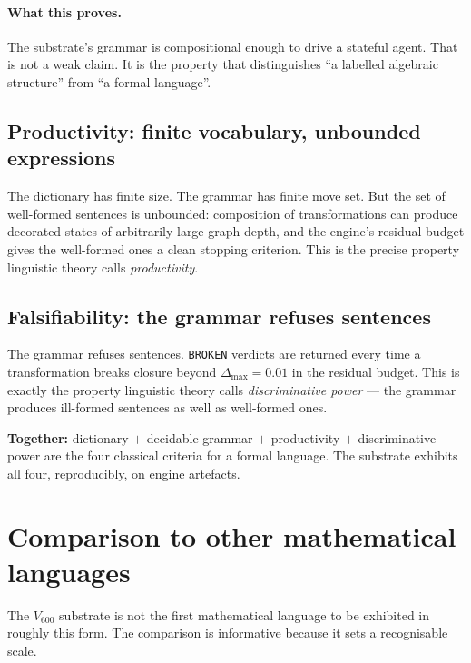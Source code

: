 \documentclass[11pt,a4paper]{article}
\begin{document}
\paragraph{What this proves.} The substrate's grammar is
compositional enough to drive a stateful agent. That is not a
weak claim. It is the property that distinguishes ``a labelled
algebraic structure'' from ``a formal language''.

\subsection{Productivity: finite vocabulary, unbounded
expressions}

The dictionary has finite size. The grammar has finite move set.
But the set of well-formed sentences is unbounded: composition of
transformations can produce decorated states of arbitrarily large
graph depth, and the engine's residual budget gives the well-formed
ones a clean stopping criterion. This is the precise
property linguistic theory calls \emph{productivity}.

\subsection{Falsifiability: the grammar refuses sentences}

The grammar refuses sentences. \texttt{BROKEN} verdicts are
returned every time a transformation breaks closure beyond
$\Delta_{\mathrm{max}} = 0.01$ in the residual budget. This is
exactly the property linguistic theory calls
\emph{discriminative power} --- the grammar produces ill-formed
sentences as well as well-formed ones.

\bigskip

\noindent
\textbf{Together:} dictionary $+$ decidable grammar $+$
productivity $+$ discriminative power are the four classical
criteria for a formal language. The substrate exhibits all four,
reproducibly, on engine artefacts.

\section{Comparison to other mathematical languages}
\label{sec:comparison}

The $V_{600}$ substrate is not the first mathematical language to
be exhibited in roughly this form. The comparison is informative
because it sets a recognisable scale.
\end{document}
